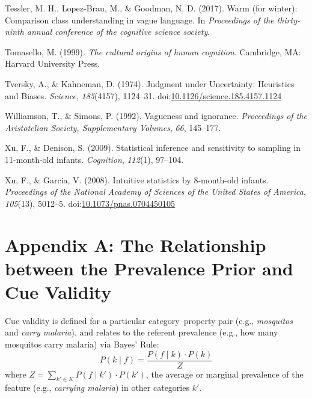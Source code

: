 \documentclass[english,,man,floatsintext]{apa6}
\theoremstyle{definition}
\theoremstyle{definition}
\theoremstyle{definition}
\theoremstyle{remark}
\begin{document}
\leavevmode\hypertarget{ref-Tessler2017}{}%
Tessler, M. H., Lopez-Brau, M., \& Goodman, N. D. (2017). Warm (for
winter): Comparison class understanding in vague language. In
\emph{Proceedings of the thirty-ninth annual conference of the cognitive
science society}.

\leavevmode\hypertarget{ref-Tomasello1999}{}%
Tomasello, M. (1999). \emph{The cultural origins of human cognition}.
Cambridge, MA: Harvard University Press.

\leavevmode\hypertarget{ref-Tversky1974}{}%
Tversky, A., \& Kahneman, D. (1974). Judgment under Uncertainty:
Heuristics and Biases. \emph{Science}, \emph{185}(4157), 1124--31.
doi:\href{https://doi.org/10.1126/science.185.4157.1124}{10.1126/science.185.4157.1124}

\leavevmode\hypertarget{ref-Williamson1992}{}%
Williamson, T., \& Simons, P. (1992). Vagueness and ignorance.
\emph{Proceedings of the Aristotelian Society, Supplementary Volumes},
\emph{66}, 145--177.

\leavevmode\hypertarget{ref-xu2009statistical}{}%
Xu, F., \& Denison, S. (2009). Statistical inference and sensitivity to
sampling in 11-month-old infants. \emph{Cognition}, \emph{112}(1),
97--104.

\leavevmode\hypertarget{ref-Xu2008}{}%
Xu, F., \& Garcia, V. (2008). Intuitive statistics by 8-month-old
infants. \emph{Proceedings of the National Academy of Sciences of the
United States of America}, \emph{105}(13), 5012--5.
doi:\href{https://doi.org/10.1073/pnas.0704450105}{10.1073/pnas.0704450105}

\newpage

\hypertarget{appendix-a-the-relationship-between-the-prevalence-prior-and-cue-validity}{%
\section{Appendix A: The Relationship between the Prevalence Prior and
Cue
Validity}\label{appendix-a-the-relationship-between-the-prevalence-prior-and-cue-validity}}

Cue validity is defined for a particular category--property pair (e.g.,
\emph{mosquitos} and \emph{carry malaria}), and relates to the referent
prevalence (e.g., how many mosquitos carry malaria) via Bayes' Rule:
\[ P(k \mid f) = \frac{P(f \mid k) \cdot P(k)}{Z} \] where
\(Z = \sum_{k' \in K} P( f \mid k') \cdot P( k')\), the average or
marginal prevalence of the feature (e.g., \emph{carrying malaria}) in
other categories \(k'\).
\end{document}
